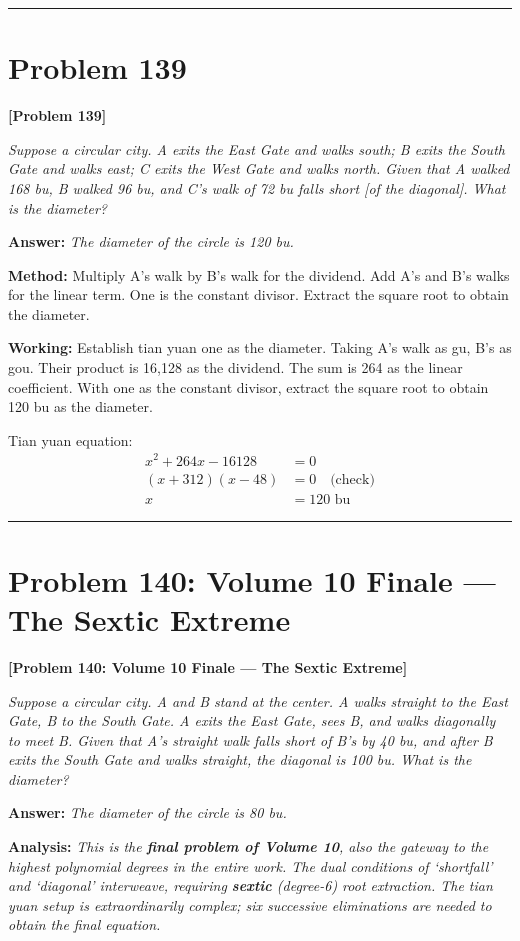 \documentclass[11pt,a4paper]{book}
\newcommand{\answer}[1]{\noindent\textbf{\color{anacolor}Answer: }\textit{#1}\par}
\newcommand{\method}[1]{\noindent\textbf{\color{methodcolor}Method: }#1\par}
\newcommand{\working}[1]{\noindent\textbf{\color{workcolor}Working: }#1\par}
\newcommand{\analysis}[1]{\noindent\textbf{\color{anacolor}Analysis: }\textit{#1}\par}
\newcommand{\shortline}{\noindent\rule{0.5\textwidth}{0.4pt}\par}
\begin{document}
\shortline

\section{Problem 139}
\label{sec:prob139}

\noindent\textbf{\color{probcolor}[Problem 139]}

\textit{Suppose a circular city. A exits the East Gate and walks south; B exits the South Gate and walks east; C exits the West Gate and walks north. Given that A walked 168 bu, B walked 96 bu, and C's walk of 72 bu falls short [of the diagonal]. What is the diameter?}

\answer{The diameter of the circle is 120 bu.}

\method{Multiply A's walk by B's walk for the dividend. Add A's and B's walks for the linear term. One is the constant divisor. Extract the square root to obtain the diameter.}

\working{Establish tian yuan one as the diameter. Taking A's walk as gu, B's as gou. Their product is 16,128 as the dividend. The sum is 264 as the linear coefficient. With one as the constant divisor, extract the square root to obtain 120 bu as the diameter.

Tian yuan equation:
\begin{align*}
x^2 + 264x - 16128 &= 0 \\
(x + 312)(x - 48) &= 0 \quad \text{(check)} \\
x &= 120 \text{ bu}
\end{align*}}

\shortline

\section{Problem 140: Volume 10 Finale --- The Sextic Extreme}
\label{sec:prob140}

\noindent\textbf{\color{probcolor}[Problem 140: Volume 10 Finale --- The Sextic Extreme]}

\textit{Suppose a circular city. A and B stand at the center. A walks straight to the East Gate, B to the South Gate. A exits the East Gate, sees B, and walks diagonally to meet B. Given that A's straight walk falls short of B's by 40 bu, and after B exits the South Gate and walks straight, the diagonal is 100 bu. What is the diameter?}

\answer{The diameter of the circle is 80 bu.}

\analysis{This is the \textbf{final problem of Volume 10}, also the gateway to the highest polynomial degrees in the entire work. The dual conditions of `shortfall' and `diagonal' interweave, requiring \textbf{sextic} (degree-6) root extraction. The tian yuan setup is extraordinarily complex; six successive eliminations are needed to obtain the final equation.}
\end{document}
